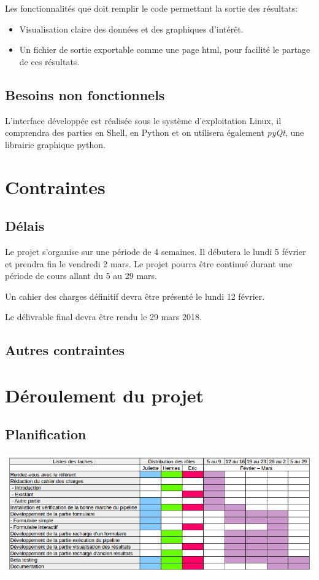\documentclass[12pt]{article}
\begin{document}
Les fonctionnalités que doit remplir le code permettant la sortie des résultats: 

\begin{itemize}
\item Visualisation claire des données et des graphiques d’intérêt.
\item Un fichier de sortie exportable comme une page html, pour facilité le partage de ces résultats. 
\end{itemize}

\subsection{Besoins non fonctionnels}

L'interface développée est réalisée sous le système d'exploitation Linux, il comprendra des parties en Shell, en Python et on utilisera également \textit{pyQt}, une librairie graphique python.

\section{Contraintes}
\subsection{Délais}

Le projet s'organise sur une période de 4 semaines. Il débutera le lundi 5 février et prendra fin le vendredi 2 mars. Le projet pourra être continué durant une période de cours allant du 5 au 29 mars.

Un cahier des charges définitif devra être présenté le lundi 12 février.

Le délivrable final devra être rendu le 29 mars 2018.

\subsection{Autres contraintes}
\section{Déroulement du projet}
\subsection{Planification}

\includegraphics[scale=0.6]{gantt5.png}
\end{document}
